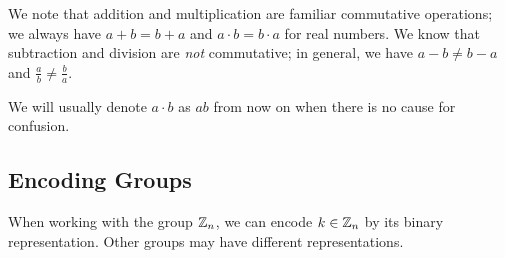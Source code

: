 We note that addition and multiplication are familiar
\gls{commutative} operations;
we always have $a+b = b+a$ and $a\cdot b = b\cdot a$ for real numbers.
We know that subtraction and division are \emph{not} \gls{commutative};
in general, we have $a-b \ne b-a$ and $\frac{a}{b} \ne \frac{b}{a}$.

We will usually denote $a\cdot b$ as $ab$ from now on
when there is no cause for confusion.

\subsection{Encoding Groups}

When working with the group $\mathbb{Z}_{n}$,
we can encode $k\in\mathbb{Z}_{n}$ by its binary representation.
Other groups may have different representations.
